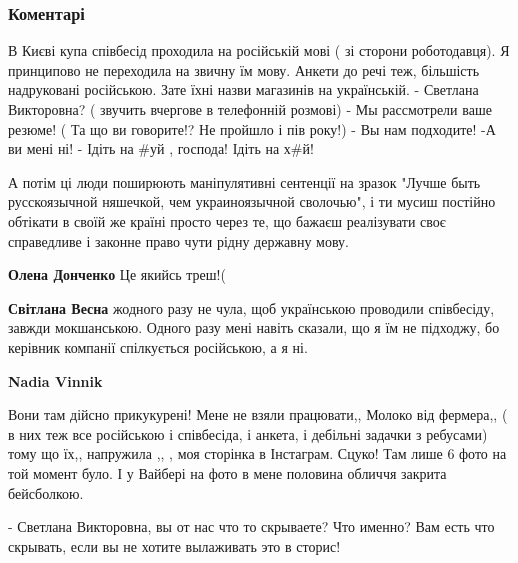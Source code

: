  
 
 
 
 
\subsubsection{Коментарі}

\begin{itemize} %

\obeycr
В Києві купа співбесід проходила на російській мові ( зі сторони роботодавця). Я принципово не переходила на звичну їм мову. Анкети до речі теж, більшість надруковані російською. Зате їхні назви магазинів на українській.
- Светлана Викторовна? ( звучить вчергове в телефонній розмові)
- Мы рассмотрели ваше резюме! ( Та що ви говорите!? Не пройшло і пів року!)
- Вы нам подходите!
-А ви мені ні!
- Ідіть на \#уй , господа! Ідіть на х\#й!
\restorecr

\begin{itemize} %

А потім ці люди поширюють маніпулятивні сентенції на зразок "Лучше быть
русскоязычной няшечкой, чем украиноязычной сволочью", і ти мусиш постійно
обтікати в своїй же країні просто через те, що бажаєш реалізувати своє
справедливе і законне право чути рідну державну мову.


\textbf{Олена Донченко} Це якийсь треш!(

\textbf{Світлана Весна} жодного разу не чула, щоб українською проводили співбесіду, завжди мокшанською. Одного разу мені навіть сказали, що я їм не підходжу, бо керівник компанії спілкується російською, а я ні.

\textbf{Nadia Vinnik} 

Вони там дійсно прикукурені! Мене не взяли працювати,, Молоко від фермера,, ( в
них теж все російською і співбесіда, і анкета, і дебільні задачки з ребусами)
тому що їх,, напружила ,, , моя сторінка в Інстаграм. Сцуко! Там лише 6 фото на
той момент було. І у Вайбері на фото в мене половина обличчя закрита
бейсболкою.

- Светлана Викторовна, вы от нас что то скрываете? Что именно? Вам есть что
скрывать, если вы не хотите вылаживать это в сторис!


\end{itemize}
\end{itemize}

